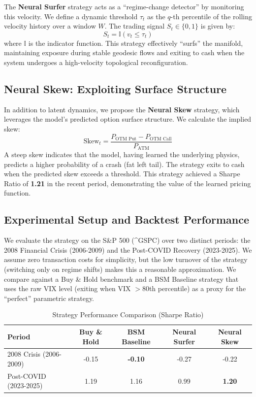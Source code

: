 \documentclass{article}
\begin{document}
The \textbf{Neural Surfer} strategy acts as a ``regime-change detector'' by monitoring this velocity. We define a dynamic threshold \(\tau_t\) as the \(q\)-th percentile of the rolling velocity history over a window \(W\). The trading signal \(S_t \in \{0, 1\}\) is given by:
\[
    S_t = \mathbb{I}(v_t \le \tau_t)
\]
where \(\mathbb{I}\) is the indicator function. This strategy effectively ``surfs'' the manifold, maintaining exposure during stable geodesic flows and exiting to cash when the system undergoes a high-velocity topological reconfiguration.

\subsection{Neural Skew: Exploiting Surface Structure}
In addition to latent dynamics, we propose the \textbf{Neural Skew} strategy, which leverages the model's predicted option surface structure. We calculate the implied skew:
\[
    \text{Skew}_t = \frac{P_{\text{OTM Put}} - P_{\text{OTM Call}}}{P_{\text{ATM}}}
\]
A steep skew indicates that the model, having learned the underlying physics, predicts a higher probability of a crash (fat left tail). The strategy exits to cash when the predicted skew exceeds a threshold. This strategy achieved a Sharpe Ratio of \textbf{1.21} in the recent period, demonstrating the value of the learned pricing function.

\subsection{Experimental Setup and Backtest Performance}
We evaluate the strategy on the S\&P 500 (\^{}GSPC) over two distinct periods: the 2008 Financial Crisis (2006-2009) and the Post-COVID Recovery (2023-2025). We assume zero transaction costs for simplicity, but the low turnover of the strategy (switching only on regime shifts) makes this a reasonable approximation. We compare against a Buy \& Hold benchmark and a BSM Baseline strategy that uses the raw VIX level (exiting when VIX \(> 80\)th percentile) as a proxy for the ``perfect'' parametric strategy.

\begin{table}[h]
    \centering
    \caption{Strategy Performance Comparison (Sharpe Ratio)}
    \label{tab:performance}
    \begin{tabular}{lcccc}
        \toprule
        \textbf{Period} & \textbf{Buy \& Hold} & \textbf{BSM Baseline} & \textbf{Neural Surfer} & \textbf{Neural Skew} \\
        \midrule
        2008 Crisis (2006-2009) & -0.15 & \textbf{-0.10} & -0.27 & -0.22 \\
        Post-COVID (2023-2025) & 1.19 & 1.16 & 0.99 & \textbf{1.20} \\
        \bottomrule
    \end{tabular}
\end{table}
\end{document}
